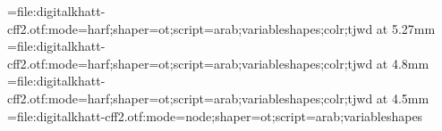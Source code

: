 \edef\pdfcompresslevel{\pdfvariable compresslevel}
\edef\pdfobjcompresslevel{\pdfvariable objcompresslevel}
\edef\pdfgentounicode{\pdfvariable gentounicode}
\newattribute{\tajweedatt}
\newattribute{\sajdaatt}



\newbox\ayaframe
\newcount\suranum


\def\suraline#1{%
\global\advance\suranum by1%
\leavevmode\raise1.2em\hbox to 0pt{\pdfbookmark{\the\suranum. #1}{sura\the\suranum}}%
\hbox to 0pt{\copy\ayaframe\hss}\centerline{\medinasura\textdir TRT#1}%
}%
\def\bismline#1{\centerline{#1}}



\def\sajdabar#1{\setattribute{\sajdaatt}{1}#1\unsetattribute{\sajdaatt}\directlua{addsajdacallback()}%
}

\font\medinafontvar={file:digitalkhatt-cff2.otf:mode=harf;shaper=ot;script=arab;variableshapes;colr;tjwd} at 5.27mm
\font\medinasura={file:digitalkhatt-cff2.otf:mode=harf;shaper=ot;script=arab;variableshapes;colr;tjwd} at 4.8mm
\font\fatiha={file:digitalkhatt-cff2.otf:mode=harf;shaper=ot;script=arab;variableshapes;colr;tjwd} at 4.5mm
\font\medinafontvarnode={file:digitalkhatt-cff2.otf:mode=node;shaper=ot;script=arab;variableshapes}

\renewcommand{\baselinestretch}{2.25}
\lineskiplimit=-100pt

\parindent=0pt
\parfillskip=0pt

\def\topglue{\nointerlineskip \vglue-\topskip \vglue}

\def\ayagraphic{\centerline{\lower1em\hbox{\texttt{[image: ayaframe.pdf]}}}}

